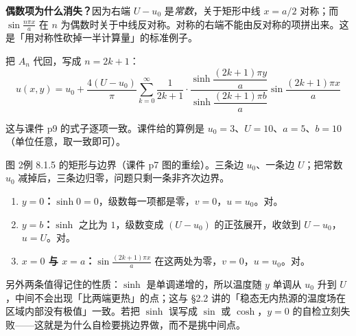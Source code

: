 \documentclass[11pt]{ctexart}
\newenvironment{figbox}{\par\begin{center}\begin{minipage}{0.94\linewidth}\centering}{\end{minipage}\end{center}\par}
\let\origsubhdr\subhdr
\renewcommand{\subhdr}[1]{\par\needspace{3\baselineskip}\origsubhdr{#1}}
\begin{document}
\textbf{偶数项为什么消失？}因为右端 $U-u_0$ 是\emph{常数}，关于矩形中线 $x=a/2$ 对称；而 $\sin\frac{n\pi x}{a}$ 在 $n$ 为偶数时关于中线反对称。对称的右端不能由反对称的项拼出来。这是「用对称性砍掉一半计算量」的标准例子。


把 $A_n$ 代回，写成 $n=2k+1$：
\begin{equation}
  \boxed{\;
  u(x,y)=u_0+\frac{4(U-u_0)}{\pi}\sum_{k=0}^{\infty}\frac{1}{2k+1}\cdot
  \frac{\sinh\dfrac{(2k+1)\pi y}{a}}{\sinh\dfrac{(2k+1)\pi b}{a}}
  \sin\dfrac{(2k+1)\pi x}{a}\;}
\end{equation}

这与课件 p9 的式子逐项一致。课件给的算例是 $u_0=3$、$U=10$、$a=5$、$b=10$（单位任意，取一致即可）。

\begin{figbox}

\small 图 2\quad 例 8.1.5 的矩形与边界（课件 p7 图的重绘）。三条边 $u_0$、一条边 $U$；把常数 $u_0$ 减掉后，三条边归零，问题只剩一条非齐次边界。
\end{figbox}


\begin{enumerate}[label=(\arabic*)]
  \item \textbf{$y=0$：}$\sinh 0=0$，级数每一项都是零，$v=0$，$u=u_0$。对。
  \item \textbf{$y=b$：}$\sinh$ 之比为 $1$，级数变成 $(U-u_0)$ 的正弦展开，收敛到 $U-u_0$，$u=U$。对。
  \item \textbf{$x=0$ 与 $x=a$：}$\sin\frac{(2k+1)\pi x}{a}$ 在这两处为零，$v=0$，$u=u_0$。对。
\end{enumerate}

另外两条值得记住的性质：$\sinh$ 是单调递增的，所以温度随 $y$ 单调从 $u_0$ 升到 $U$，中间不会出现「比两端更热」的点；这与 \S2.2 讲的「稳态无内热源的温度场在区域内部没有极值」一致。若把 $\sinh$ 误写成 $\sin$ 或 $\cosh$，$y=0$ 的自检立刻失败——这就是为什么自检要挑边界做，而不是挑中间点。
\end{document}
